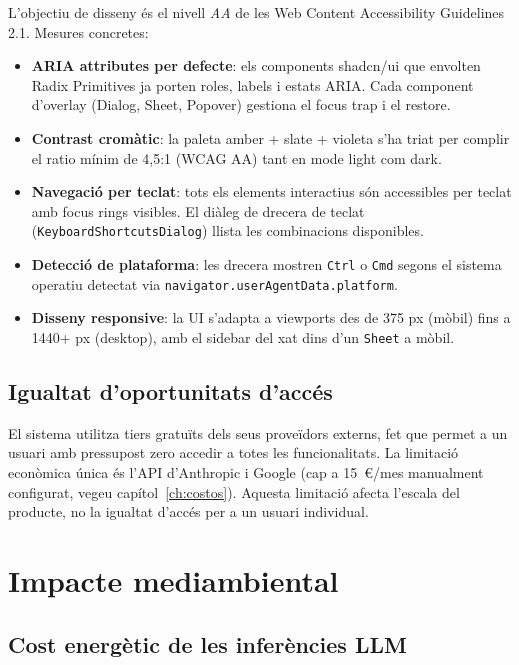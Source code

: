 L'objectiu de disseny és el nivell \emph{AA} de les Web Content Accessibility Guidelines 2.1. Mesures concretes:

\begin{itemize}
    \item \textbf{ARIA attributes per defecte}: els components shadcn/ui que envolten Radix Primitives ja porten roles, labels i estats ARIA. Cada component d'overlay (Dialog, Sheet, Popover) gestiona el focus trap i el restore.
    \item \textbf{Contrast cromàtic}: la paleta amber + slate + violeta s'ha triat per complir el ratio mínim de 4{,}5:1 (WCAG AA) tant en mode light com dark.
    \item \textbf{Navegació per teclat}: tots els elements interactius són accessibles per teclat amb focus rings visibles. El diàleg de drecera de teclat (\texttt{KeyboardShortcutsDialog}) llista les combinacions disponibles.
    \item \textbf{Detecció de plataforma}: les drecera mostren \texttt{Ctrl} o \texttt{Cmd} segons el sistema operatiu detectat via \texttt{navigator.userAgentData.platform}.
    \item \textbf{Disseny responsive}: la UI s'adapta a viewports des de 375 px (mòbil) fins a 1440+ px (desktop), amb el sidebar del xat dins d'un \texttt{Sheet} a mòbil.
\end{itemize}

\subsection{Igualtat d'oportunitats d'accés}

El sistema utilitza tiers gratuïts dels seus proveïdors externs, fet que permet a un usuari amb pressupost zero accedir a totes les funcionalitats. La limitació econòmica única és l'API d'Anthropic i Google (cap a 15~\euro{}/mes manualment configurat, vegeu capítol~\ref{ch:costos}). Aquesta limitació afecta l'escala del producte, no la igualtat d'accés per a un usuari individual.

\section{Impacte mediambiental}
\label{sec:medi-ambient}

\subsection{Cost energètic de les inferències LLM}

